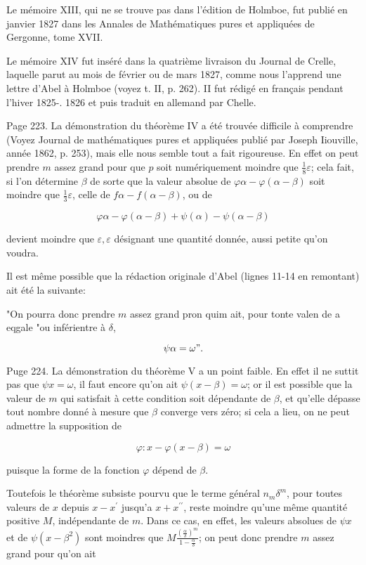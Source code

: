 \documentclass{article}
\begin{document}
Le mémoire XIII, qui ne se trouve pas dans l'édition de Holmboe, fut publié en janvier 1827 dans les Annales de Mathématiques pures et appliquées de Gergonne, tome XVII.

Le mémoire XIV fut inséré dans la quatrième livraison du Journal de Crelle, laquelle parut au mois de février ou de mars 1827, comme nous l'apprend une lettre d'Abel à Holmboe (voyez t. II, p. 262). II fut rédigé en français pendant l'hiver 1825-. 1826 et puis traduit en allemand par Chelle.

Page 223. La démonstration du théorème IV a été trouvée difficile à comprendre (Voyez Journal de mathématiques pures et appliquées publié par Joseph Iiouville, année 1862, p. 253), mais elle nous semble tout a fait rigoureuse. En effet on peut prendre \(m\) assez grand pour que \(p\) soit numériquement moindre que \(\frac{1}{8} \varepsilon\); cela fait, si l'on détermine \(\beta\) de sorte que la valeur absolue de \(\varphi \alpha-\varphi(\alpha-\beta)\) soit moindre que \(\frac{1}{3} \varepsilon\), celle de \(f \alpha-f(\alpha-\beta)\), ou de

\[
\varphi \alpha-\varphi(\alpha-\beta)+\psi(\alpha)-\psi(\alpha-\beta)
\]

devient moindre que \(\varepsilon, \varepsilon\) désignant une quantité donnée, aussi petite qu'on voudra.

Il est même possible que la rédaction originale d'Abel (lignes 11-14 en remontant) ait été la suivante:

"On pourra donc prendre \(m\) assez grand pron quim ait, pour tonte valen de a eqgale "ou inférientre à \(\delta\),

\[
\psi \alpha=\omega " .
\]

Puge 224. La démonstration du théorème \(\mathrm{V}\) a un point faible. En effet il ne suttit pas que \(\psi x=\omega\), il faut encore qu'on ait \(\psi(x-\beta)=\omega\); or il est possible que la valeur de \(m\) qui satisfait à cette condition soit dépendante de \(\beta\), et qu'elle dépasse tout nombre donné à mesure que \(\beta\) converge vers zéro; si cela a lieu, on ne peut admettre la supposition de

\[
\varphi: x-\varphi(x-\beta)=\omega
\]

puisque la forme de la fonction \(\varphi\) dépend de \(\beta\).

Toutefois le théorème subsiste pourvu que le terme général \(n_{m} \delta^{m}\), pour toutes valeurs de \(x\) depuis \(x-x^{\prime}\) jusqu'a \(x+x^{\prime \prime}\), reste moindre qu'une même quantité positive \(M\), indépendante de \(m\). Dans ce cas, en effet, les valeurs absolues de \(\psi x\) et de \(\psi\left(x-\beta^{2}\right)\) sont moindres que \(M \frac{\left(\frac{\alpha}{\delta}\right)^{m}}{1-\frac{\alpha}{\delta}}\); on peut donc prendre \(m\) assez grand pour qu'on ait
\end{document}
